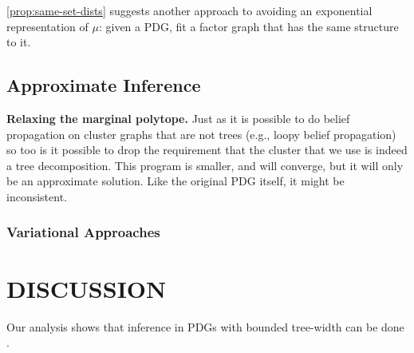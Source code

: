 \documentclass[twoside]{article}
\begin{document}


\cref{prop:same-set-dists} suggests another approach to avoiding an exponential representation of $\mu$: given a PDG, fit a factor graph that has the same structure to it.

\subsection{Approximate Inference}
\textbf{Relaxing the marginal polytope.}
Just as it is possible to do belief propagation on cluster graphs that are not trees (e.g., loopy belief propagation)
so too is it possible to drop the requirement that the cluster that we use is indeed a tree decomposition.
This program is smaller, and will converge, but it will only be an approximate solution.
Like the original PDG itself, it might be inconsistent.

\subsubsection{Variational Approaches}






\section{DISCUSSION}

Our analysis shows that inference in PDGs with bounded tree-width can be done .


\end{document}
